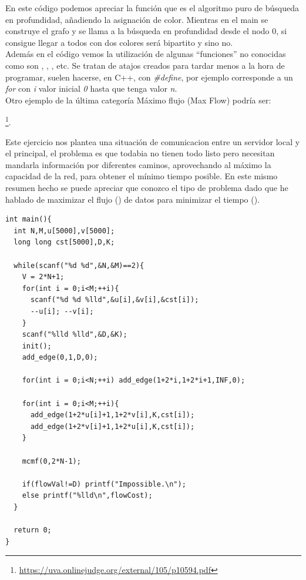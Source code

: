 En este código podemos apreciar la función  que es el
algoritmo puro de búsqueda en profundidad, añadiendo la asignación de
color. Mientras en el main se construye el grafo y se llama a la
búsqueda en profundidad desde el nodo 0, si consigue llegar a todos
con dos colores será bipartito y sino no.\\

Además en el código vemos la utilización de algunas ``funciones'' no
conocidas como son , , , etc. Se tratan
de atajos creados para tardar menos a la hora de programar, suelen
hacerse, en C++, con \emph{\#define}, por ejemplo 
corresponde a un \emph{for} con \emph{i} valor inicial \emph{0} hasta
que tenga valor \emph{n}.\\

Otro ejemplo de la última categoría Máximo flujo (Max Flow) podría
ser:

\footnote{\url{https://uva.onlinejudge.org/external/105/p10594.pdf}}.

Este ejercicio nos plantea una situación de comunicacion entre un
servidor local y el principal, el problema es que todabia no tienen
todo listo pero necesitan mandarla información por diferentes caminos,
aprovechando al máximo la capacidad de la red, para obtener el mínimo
tiempo posible. En este mismo resumen hecho se puede apreciar que
conozco el tipo de problema dado que he hablado de maximizar el flujo
() de datos para minimizar el tiempo ().

\begin{lstlisting}
int main(){
  int N,M,u[5000],v[5000];
  long long cst[5000],D,K;

  while(scanf("%d %d",&N,&M)==2){
    V = 2*N+1;
    for(int i = 0;i<M;++i){
      scanf("%d %d %lld",&u[i],&v[i],&cst[i]);
      --u[i]; --v[i];
    }
    scanf("%lld %lld",&D,&K);
    init();
    add_edge(0,1,D,0);
    
    for(int i = 0;i<N;++i) add_edge(1+2*i,1+2*i+1,INF,0);
    
    for(int i = 0;i<M;++i){
      add_edge(1+2*u[i]+1,1+2*v[i],K,cst[i]);
      add_edge(1+2*v[i]+1,1+2*u[i],K,cst[i]);
    }
        
    mcmf(0,2*N-1);
        
    if(flowVal!=D) printf("Impossible.\n");
    else printf("%lld\n",flowCost);
  }
  
  return 0;
}
\end{lstlisting}


